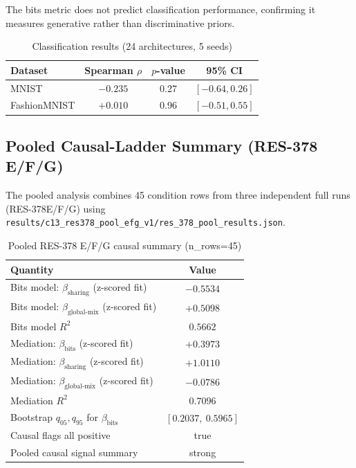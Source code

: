 The bits metric does not predict classification performance, confirming it measures generative rather than discriminative priors.

\begin{table}[H]
\centering
\caption{Classification results (24 architectures, 5 seeds)}
\begin{tabular}{lccc}
\toprule
Dataset & Spearman $\rho$ & $p$-value & 95\% CI \\
\midrule
MNIST & $-0.235$ & 0.27 & $[-0.64, 0.26]$ \\
FashionMNIST & $+0.010$ & 0.96 & $[-0.51, 0.55]$ \\
\bottomrule
\end{tabular}
\end{table}

\subsection{Pooled Causal-Ladder Summary (RES-378 E/F/G)}
\label{app:res378_pool}

The pooled analysis combines 45 condition rows from three independent full runs
(RES-378E/F/G) using \texttt{results/c13\_res378\_pool\_efg\_v1/res\_378\_pool\_results.json}.

\begin{table}[H]
\centering
\caption{Pooled RES-378 E/F/G causal summary (n\_rows=45)}
\label{tab:res378_pool_summary}
\begin{tabular}{lc}
\toprule
Quantity & Value \\
\midrule
Bits model: $\beta_{\text{sharing}}$ (z-scored fit) & $-0.5534$ \\
Bits model: $\beta_{\text{global-mix}}$ (z-scored fit) & $+0.5098$ \\
Bits model $R^2$ & $0.5662$ \\
Mediation: $\beta_{\text{bits}}$ (z-scored fit) & $+0.3973$ \\
Mediation: $\beta_{\text{sharing}}$ (z-scored fit) & $+1.0110$ \\
Mediation: $\beta_{\text{global-mix}}$ (z-scored fit) & $-0.0786$ \\
Mediation $R^2$ & $0.7096$ \\
Bootstrap $q_{05},q_{95}$ for $\beta_{\text{bits}}$ & $[0.2037,\ 0.5965]$ \\
Causal flags all positive & true \\
Pooled causal signal summary & strong \\
\bottomrule
\end{tabular}
\end{table}

